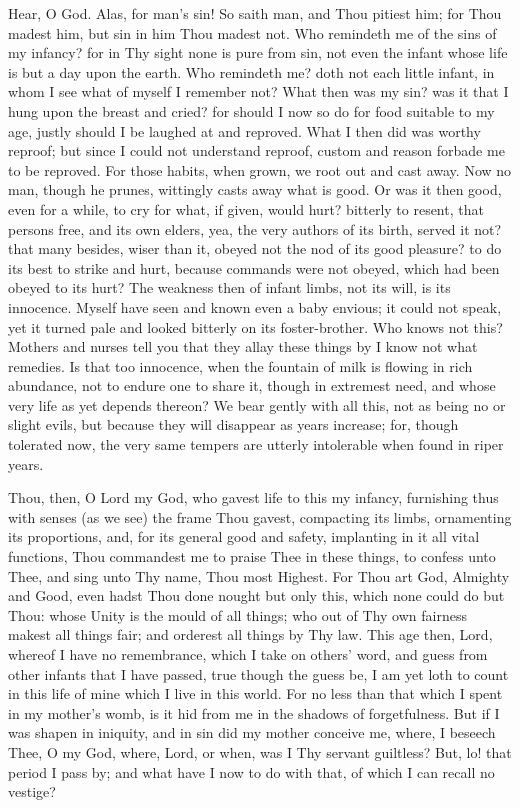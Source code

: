 \documentclass[b5paper,openright,12pt,twoside]{book}
\begin{document}
Hear, O God. Alas, for man's sin! So saith man, and Thou pitiest him;
for Thou madest him, but sin in him Thou madest not. Who remindeth me of
the sins of my infancy? for in Thy sight none is pure from sin, not even
the infant whose life is but a day upon the earth. Who remindeth me?
doth not each little infant, in whom I see what of myself I remember
not? What then was my sin? was it that I hung upon the breast and cried?
for should I now so do for food suitable to my age, justly should I be
laughed at and reproved. What I then did was worthy reproof; but since
I could not understand reproof, custom and reason forbade me to be
reproved. For those habits, when grown, we root out and cast away. Now
no man, though he prunes, wittingly casts away what is good. Or was
it then good, even for a while, to cry for what, if given, would hurt?
bitterly to resent, that persons free, and its own elders, yea, the very
authors of its birth, served it not? that many besides, wiser than it,
obeyed not the nod of its good pleasure? to do its best to strike and
hurt, because commands were not obeyed, which had been obeyed to its
hurt? The weakness then of infant limbs, not its will, is its innocence.
Myself have seen and known even a baby envious; it could not speak, yet
it turned pale and looked bitterly on its foster-brother. Who knows not
this? Mothers and nurses tell you that they allay these things by I know
not what remedies. Is that too innocence, when the fountain of milk
is flowing in rich abundance, not to endure one to share it, though
in extremest need, and whose very life as yet depends thereon? We bear
gently with all this, not as being no or slight evils, but because they
will disappear as years increase; for, though tolerated now, the very
same tempers are utterly intolerable when found in riper years.

Thou, then, O Lord my God, who gavest life to this my infancy,
furnishing thus with senses (as we see) the frame Thou gavest,
compacting its limbs, ornamenting its proportions, and, for its general
good and safety, implanting in it all vital functions, Thou commandest
me to praise Thee in these things, to confess unto Thee, and sing unto
Thy name, Thou most Highest. For Thou art God, Almighty and Good, even
hadst Thou done nought but only this, which none could do but Thou:
whose Unity is the mould of all things; who out of Thy own fairness
makest all things fair; and orderest all things by Thy law. This age
then, Lord, whereof I have no remembrance, which I take on others' word,
and guess from other infants that I have passed, true though the guess
be, I am yet loth to count in this life of mine which I live in this
world. For no less than that which I spent in my mother's womb, is it
hid from me in the shadows of forgetfulness. But if I was shapen in
iniquity, and in sin did my mother conceive me, where, I beseech Thee, O
my God, where, Lord, or when, was I Thy servant guiltless? But, lo! that
period I pass by; and what have I now to do with that, of which I can
recall no vestige?
\end{document}
